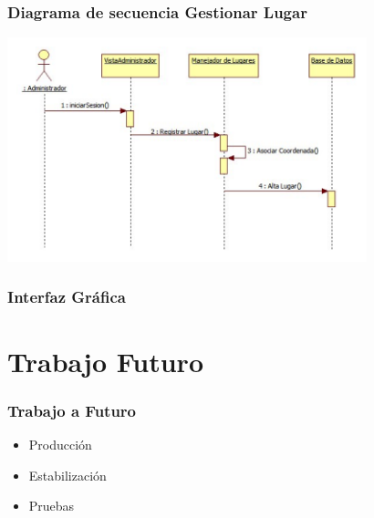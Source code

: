 \documentclass[12pt]{beamer}
\begin{document}
\begin{frame}
	\frametitle{Diagrama de secuencia Gestionar Lugar}
	\begin{center}
		\includegraphics[height=6.5cm]{imagenes/secGestionarLugar.png}	
	\end{center}
\end{frame}

\begin{frame}
	\frametitle{Interfaz Gráfica}
	\begin{block}{}
	\begin{center}
	
  		\end{center}
   \end{block}
\end{frame}

\section{Trabajo Futuro}

\begin{frame}
	\frametitle{Trabajo a Futuro}
	\begin{block}{}
		\begin{itemize}
	\item Producción
	\item Estabilización
	\item Pruebas
\end{itemize}
	\end{block}

\end{frame}  
\end{document}
